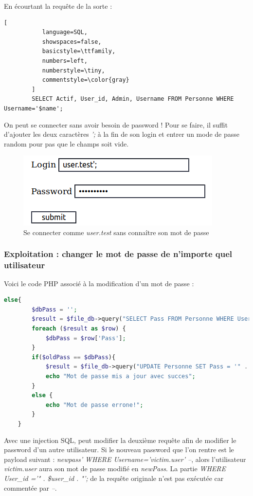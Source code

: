 \documentclass[12pt]{article}
\begin{document}
En écourtant la requête de la sorte : 

\begin{lstlisting}[
           language=SQL,
           showspaces=false,
           basicstyle=\ttfamily,
           numbers=left,
           numberstyle=\tiny,
           commentstyle=\color{gray}
        ]
        SELECT Actif, User_id, Admin, Username FROM Personne WHERE Username='$name';
\end{lstlisting}

On peut se connecter sans avoir besoin de password ! Pour se faire, il suffit d'ajouter les deux caractères \textit{';} à la fin de son login et entrer un mode de passe random pour pas que le champs soit vide.

\begin{figure}[H]
\centering
\includegraphics[width=\linewidth]{images/sqliLogin.png}
\caption{Se connecter comme \textit{user.test} sans connaître son mot de passe}
\end{figure}

\subsubsection{Exploitation : changer le mot de passe de n'importe quel utilisateur}
Voici le code PHP associé à la modification d'un mot de passe : 
\begin{lstlisting}[language=PHP]
    else{
        $dbPass = '';
        $result = $file_db->query("SELECT Pass FROM Personne WHERE User_id ='" . $user_id . "';");
        foreach ($result as $row) {
            $dbPass = $row['Pass'];
        }
        if($oldPass == $dbPass){
            $result = $file_db->query("UPDATE Personne SET Pass = '" . $newPass . "' WHERE User_id ='" . $user_id . "';");
            echo "Mot de passe mis a jour avec succes";
        }
        else {
            echo "Mot de passe errone!";
        }
    }
\end{lstlisting}

Avec une injection SQL, peut modifier la deuxième requête afin de modifier le password d'un autre utilisateur. Si le nouveau password que l'on rentre est le payload suivant : \textit{newpass' WHERE Username='victim.user' --}, alors l'utilisateur \textit{victim.user} aura son mot de passe modifié en \textit{newPass}. La partie \textit{WHERE User\_id ='" . \$user\_id . "';} de la requête originale n'est pas exécutée car commentée par \textit{--}.
\end{document}

